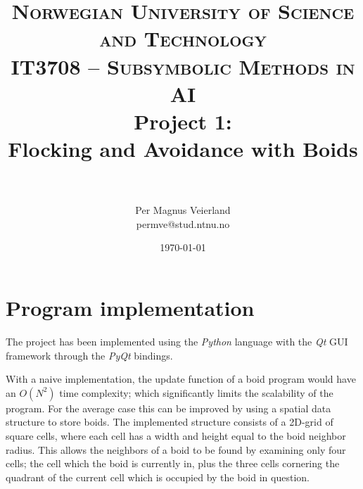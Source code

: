 

\usepackage{tabularx} %
\usepackage{ragged2e} %
\usepackage{relsize} %

\def\tabularxcolumn#1{m{#1}}

\title{
\normalfont \normalsize
\textsc{Norwegian University of Science and Technology\\IT3708 -- Subsymbolic Methods in AI}
\horrule{0.5pt} \\[0.4cm]
\huge Project 1:\\ Flocking and Avoidance with Boids\\
\horrule{2pt} \\[0.5cm]
}

\author{Per Magnus Veierland\\permve@stud.ntnu.no}

\date{\normalsize\today}




\fancyfoot[C]{}
\maketitle

\newpage
{} %
\setcounter{page}{1}

\section*{Program implementation}

The project has been implemented using the \textit{Python} language with the \textit{Qt} \ac{GUI} framework through the \textit{PyQt} bindings.

With a naive implementation, the update function of a boid program would have an $O(N^2)$ time complexity; which significantly limits the scalability of the program. For the average case this can be improved by using a spatial data structure to store boids. The implemented structure consists of a 2D-grid of square cells, where each cell has a width and height equal to the boid neighbor radius. This allows the neighbors of a boid to be found by examining only four cells; the cell which the boid is currently in, plus the three cells cornering the quadrant of the current cell which is occupied by the boid in question.

